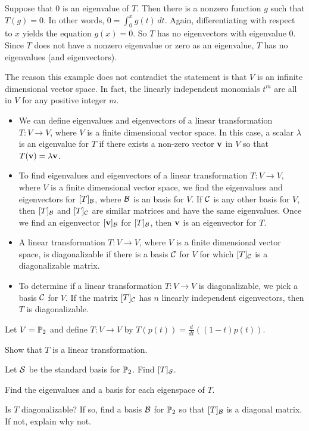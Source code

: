 \item Suppose that $0$ is an eigenvalue of $T$. Then there is a nonzero function $g$ such that $T(g) = 0$. In other words, $0 = \int_0^x g(t) \, dt$. Again, differentiating with respect to $x$ yields the equation $g(x) = 0$. So $T$ has no eigenvectors with eigenvalue $0$. Since $T$ does not have a nonzero eigenvalue or zero as an eigenvalue, $T$ has no eigenvalues (and eigenvectors). 

\item The reason this example does not contradict the statement is that $V$ is an infinite dimensional vector space. In fact, the linearly independent monomials $t^m$ are all in $V$ for any positive integer $m$. 

\ea





\begin{itemize}
\item We can define eigenvalues and eigenvectors of a linear transformation $T : V \to V$, where $V$ is a finite dimensional vector space. In this case, a scalar $\lambda$ is an eigenvalue for $T$ if there exists a non-zero vector $\mathbf{v}$ in $V$ so that $T(\mathbf{v}) = \lambda \mathbf{v}$.   
\item To find eigenvalues and eigenvectors of a linear transformation $T : V \to V$, where $V$ is a finite dimensional vector space, we find the eigenvalues and eigenvectors for $[T]_{\mathcal{B}}$, where $\mathcal{B}$ is an basis for $V$. If $\mathcal{C}$ is any other basis for $V$, then $[T]_{\mathcal{B}}$ and $[T]_{\mathcal{C}}$ are similar matrices and have the same eigenvalues. Once we find an eigenvector $[\mathbf{v}]_{\mathcal{B}}$ for $[T]_{\mathcal{B}}$, then $\mathbf{v}$ is an eigenvector for $T$. 
\item A linear transformation $T: V \to V$, where $V$ is a finite dimensional vector space, is diagonalizable if there is a basis $\mathcal{C}$ for $V$ for which $[T]_{\mathcal{C}}$ is a diagonalizable matrix. 
\item To determine if a linear transformation $T : V \to V$ is diagonalizable, we pick a basis $\mathcal{C}$ for $V$. If the matrix $[T]_{\mathcal{C}}$ has $n$ linearly independent eigenvectors, then $T$ is diagonalizable. 
\end{itemize}

\be
\item Let $V = \mathbb{P}_2$ and define $T: V \to V$ by $T(p(t)) = \frac{d}{dt} \left((1-t)p(t)\right)$. 
	\ba
	\item Show that $T$ is a linear transformation.
	\item Let $\mathcal{S}$ be the standard basis for $\mathbb{P}_2$. Find $[T]_{\mathcal{S}}$. 
	\item Find the eigenvalues and a basis for each eigenspace of $T$. 
	\item Is $T$ diagonalizable? If so, find a basis $\mathcal{B}$ for $\mathbb{P}_2$ so that $[T]_{\mathcal{B}}$ is a diagonal matrix. If not, explain why not. 
	\ea


